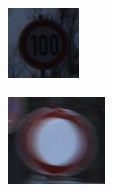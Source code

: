 \begin{figure}[H]
\begin{subfigure}[b]{0.2\textwidth}
       \caption{}
       \label{fig:gtrsb-paper-bsp-image-2}
   \end{subfigure}
   \hspace{2em}%
   \begin{subfigure}[b]{0.2\textwidth}
       \centering
       \includegraphics[height=\textwidth]{../images/GTSRB/00040.png}
       \caption{}
       \label{fig:gtrsb-paper-bsp-image-3}
   \end{subfigure}
   \hspace{2em}%
   \begin{subfigure}[b]{0.2\textwidth}
    \centering
    \includegraphics[height=\textwidth]{../images/GTSRB/00052.png}

\end{subfigure}
\end{figure}
